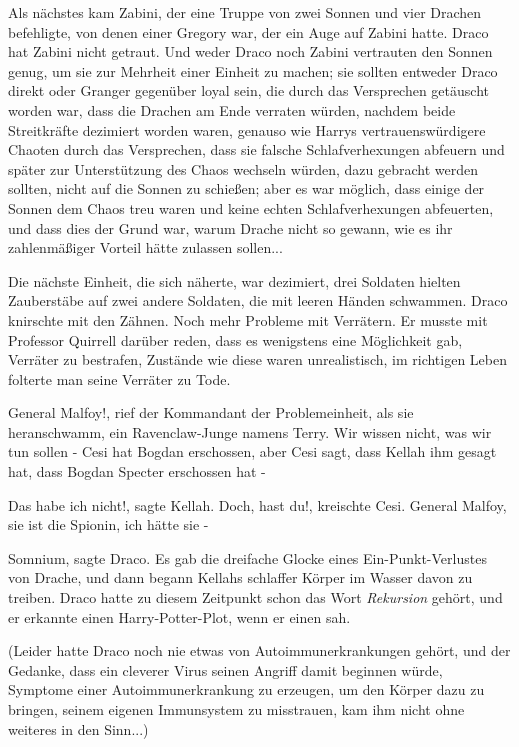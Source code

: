 Als nächstes kam Zabini, der eine Truppe von zwei Sonnen und vier Drachen
befehligte, von denen einer Gregory war, der ein Auge auf Zabini hatte. Draco
hat Zabini nicht getraut. Und weder Draco noch Zabini vertrauten den Sonnen
genug, um sie zur Mehrheit einer Einheit zu machen; sie sollten entweder Draco
direkt oder Granger gegenüber loyal sein, die durch das Versprechen getäuscht
worden war, dass die Drachen am Ende verraten würden, nachdem beide Streitkräfte
dezimiert worden waren, genauso wie Harrys vertrauenswürdigere Chaoten durch das
Versprechen, dass sie falsche Schlafverhexungen abfeuern und später zur
Unterstützung des Chaos wechseln würden, dazu gebracht werden sollten, nicht auf
die Sonnen zu schießen; aber es war möglich, dass einige der Sonnen dem Chaos
treu waren und keine echten Schlafverhexungen abfeuerten, und dass dies der
Grund war, warum Drache nicht so gewann, wie es ihr zahlenmäßiger Vorteil hätte
zulassen sollen...

Die nächste Einheit, die sich näherte, war dezimiert, drei Soldaten hielten
Zauberstäbe auf zwei andere Soldaten, die mit leeren Händen schwammen. Draco
knirschte mit den Zähnen. Noch mehr Probleme mit Verrätern. Er musste mit
Professor Quirrell darüber reden, dass es wenigstens eine Möglichkeit gab,
Verräter zu bestrafen, Zustände wie diese waren unrealistisch, im richtigen
Leben folterte man seine Verräter zu Tode.

\glqq{}General Malfoy!\grqq{}, rief der Kommandant der Problemeinheit, als sie
heranschwamm, ein Ravenclaw-Junge namens Terry. \glqq{}Wir wissen nicht, was wir
tun sollen - Cesi hat Bogdan erschossen, aber Cesi sagt, dass Kellah ihm gesagt
hat, dass Bogdan Specter erschossen hat -\grqq{}

\glqq{}Das habe ich nicht!\grqq{}, sagte Kellah. \glqq{}Doch, hast du!\grqq{},
kreischte Cesi. \glqq{}General Malfoy, sie ist die Spionin, ich hätte sie -\grqq{}

\glqq{}Somnium\grqq{}, sagte Draco. Es gab die dreifache Glocke eines
Ein-Punkt-Verlustes von Drache, und dann begann Kellahs schlaffer Körper im
Wasser davon zu treiben. Draco hatte zu diesem Zeitpunkt schon das Wort \glqq{}
\emph{Rekursion}\grqq{} gehört, und er erkannte einen Harry-Potter-Plot, wenn er
einen sah.

(Leider hatte Draco noch nie etwas von Autoimmunerkrankungen gehört, und der
Gedanke, dass ein cleverer Virus seinen Angriff damit beginnen würde, Symptome
einer Autoimmunerkrankung zu erzeugen, um den Körper dazu zu bringen, seinem
eigenen Immunsystem zu misstrauen, kam ihm nicht ohne weiteres in den Sinn...)

